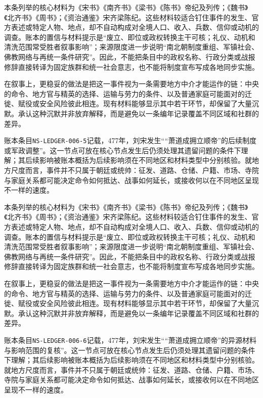 本条列举的核心材料为《宋书》《南齐书》《梁书》《陈书》帝纪及列传；《魏书》《北齐书》《周书》；《资治通鉴》宋齐梁陈纪。这些材料较适合钉住事件的发生、官方表述或特定人物、地点，却不自动构成对全境人口、收入、兵数、信仰或动机的调查。账本的置信与材料提示是“废立、即位或政权转换主干可核；礼仪、动机和清洗范围常受胜者叙事影响”；来源限度进一步说明“南北朝制度重组、军镇社会、佛教网络与再统一条件研究”。因此，不能把条目中的政权名称、行政分类或战报修辞直接转译为固定族群和统一社会意志，也不能将制度宣布写成各地同步实施。

在叙事上，更稳妥的做法是把这一事件视为一条需要地方中介才能运作的链：中央的命令、地方官与精英的选择、运输与劳力的条件、以及普通家庭可能面对的迁徙、赋役或安全风险彼此相连。现有材料能够显示其中若干环节，却保留了大量沉默。承认这种沉默并非放弃解释，而是避免以一条编年记录覆盖不同区域和社群的差异。

账本条目\texttt{NS-LEDGER-006-5}记载，477年，刘宋发生““萧道成拥立顺帝”的后续制度或军政调整”。这一节点可放在核心节点发生后仍须处理其遗留问题的条件下理解；其后续影响被账本概括为后续影响须在不同地区和材料类型中分别核验。就地方尺度而言，事件并不只属于朝廷或统帅：征发、道路、仓储、户籍、市场、寺院与家庭关系都可能决定命令如何抵达、战事如何延长，或接收何以在不同地区呈现不一样的速度。

本条列举的核心材料为《宋书》《南齐书》《梁书》《陈书》帝纪及列传；《魏书》《北齐书》《周书》；《资治通鉴》宋齐梁陈纪。这些材料较适合钉住事件的发生、官方表述或特定人物、地点，却不自动构成对全境人口、收入、兵数、信仰或动机的调查。账本的置信与材料提示是“废立、即位或政权转换主干可核；礼仪、动机和清洗范围常受胜者叙事影响”；来源限度进一步说明“南北朝制度重组、军镇社会、佛教网络与再统一条件研究”。因此，不能把条目中的政权名称、行政分类或战报修辞直接转译为固定族群和统一社会意志，也不能将制度宣布写成各地同步实施。

在叙事上，更稳妥的做法是把这一事件视为一条需要地方中介才能运作的链：中央的命令、地方官与精英的选择、运输与劳力的条件、以及普通家庭可能面对的迁徙、赋役或安全风险彼此相连。现有材料能够显示其中若干环节，却保留了大量沉默。承认这种沉默并非放弃解释，而是避免以一条编年记录覆盖不同区域和社群的差异。

账本条目\texttt{NS-LEDGER-006-6}记载，477年，刘宋发生““萧道成拥立顺帝”的异源材料与影响范围的复核”。这一节点可放在核心节点发生后仍须处理其遗留问题的条件下理解；其后续影响被账本概括为后续影响须在不同地区和材料类型中分别核验。就地方尺度而言，事件并不只属于朝廷或统帅：征发、道路、仓储、户籍、市场、寺院与家庭关系都可能决定命令如何抵达、战事如何延长，或接收何以在不同地区呈现不一样的速度。

